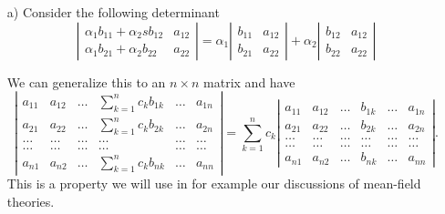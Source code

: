 \documentclass[prc]{revtex4}
\begin{document}
\begin{enumerate}


\item[a)] 
Consider the following determinant
\[
\left| \begin{array}{cc} \alpha_1b_{11}+\alpha_2sb_{12}& a_{12}\\
                         \alpha_1b_{21}+\alpha_2b_{22}&a_{22}\end{array} \right|=\alpha_1\left|\begin{array}{cc} b_{11}& a_{12}\\
                         b_{21}&a_{22}\end{array} \right|+\alpha_2\left| \begin{array}{cc} b_{12}& a_{12}\\b_{22}&a_{22}\end{array} \right|
\]

We can generalize this to  an $n\times n$ matrix and have 
\[
\left| \begin{array}{cccccc} a_{11}& a_{12} & \dots & \sum_{k=1}^n c_k b_{1k} &\dots & a_{1n}\\
a_{21}& a_{22} & \dots & \sum_{k=1}^n c_k b_{2k} &\dots & a_{2n}\\
\dots & \dots & \dots & \dots & \dots & \dots \\
\dots & \dots & \dots & \dots & \dots & \dots \\
a_{n1}& a_{n2} & \dots & \sum_{k=1}^n c_k b_{nk} &\dots & a_{nn}\end{array} \right|=
\sum_{k=1}^n c_k\left| \begin{array}{cccccc} a_{11}& a_{12} & \dots &  b_{1k} &\dots & a_{1n}\\
a_{21}& a_{22} & \dots &  b_{2k} &\dots & a_{2n}\\
\dots & \dots & \dots & \dots & \dots & \dots\\
\dots & \dots & \dots & \dots & \dots & \dots\\
a_{n1}& a_{n2} & \dots &  b_{nk} &\dots & a_{nn}\end{array} \right| .
\]
This is a property we will use in for example our discussions of mean-field theories.



\end{enumerate}
\end{document}
